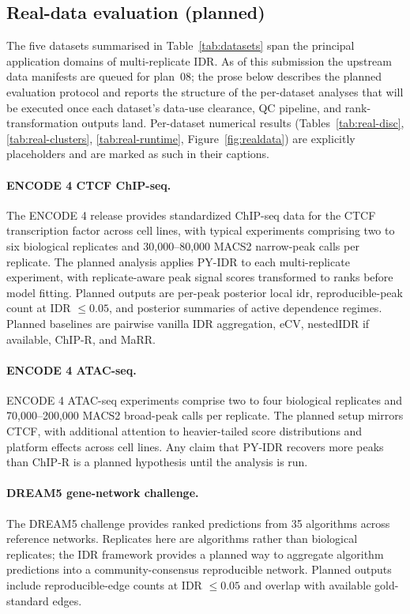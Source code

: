 \subsection{Real-data evaluation (planned)}
\label{sec:real}



The five datasets summarised in Table~\ref{tab:datasets} span the principal
application domains of multi-replicate IDR. As of this submission the
upstream data manifests are queued for plan~08; the prose below describes the
planned evaluation protocol and reports the structure of the per-dataset
analyses that will be executed once each dataset's data-use clearance, QC
pipeline, and rank-transformation outputs land. Per-dataset numerical results
(Tables~\ref{tab:real-disc}, \ref{tab:real-clusters},
\ref{tab:real-runtime}, Figure~\ref{fig:realdata}) are explicitly placeholders
and are marked as such in their captions.

\paragraph{ENCODE 4 CTCF ChIP-seq.}
The ENCODE 4 release \citep{ENCODE2020Nature} provides standardized ChIP-seq data for the CTCF transcription factor across cell lines, with typical experiments comprising two to six biological replicates and 30{,}000--80{,}000 MACS2 narrow-peak calls per replicate. The planned analysis applies PY-IDR to each multi-replicate experiment, with replicate-aware peak signal scores transformed to ranks before model fitting. Planned outputs are per-peak posterior local idr, reproducible-peak count at IDR $\leq0.05$, and posterior summaries of active dependence regimes. Planned baselines are pairwise vanilla IDR aggregation, eCV, nestedIDR if available, ChIP-R, and MaRR.

\paragraph{ENCODE 4 ATAC-seq.}
ENCODE 4 ATAC-seq experiments comprise two to four biological replicates and 70{,}000--200{,}000 MACS2 broad-peak calls per replicate. The planned setup mirrors CTCF, with additional attention to heavier-tailed score distributions and platform effects across cell lines. Any claim that PY-IDR recovers more peaks than ChIP-R is a planned hypothesis until the analysis is run.

\paragraph{DREAM5 gene-network challenge.}
The DREAM5 challenge \citep{Marbach2012DREAM5} provides ranked predictions from 35 algorithms across reference networks. Replicates here are algorithms rather than biological replicates; the IDR framework provides a planned way to aggregate algorithm predictions into a community-consensus reproducible network. Planned outputs include reproducible-edge counts at IDR $\leq0.05$ and overlap with available gold-standard edges.

